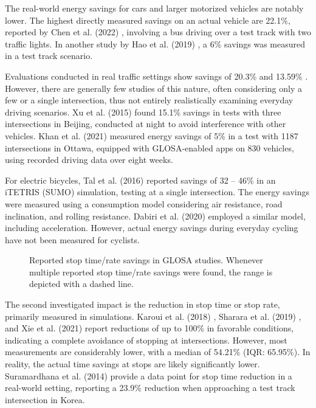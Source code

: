 The real-world energy savings for cars and larger motorized vehicles are notably lower. The highest directly measured savings on an actual vehicle are 22.1\%, reported by Chen et al. (2022) \cite{chen_developing_2022}, involving a bus driving over a test track with two traffic lights. In another study by Hao et al. (2019) \cite{hao_eco-approach_2019}, a 6\% savings was measured in a test track scenario.

Evaluations conducted in real traffic settings show savings of 20.3\% \cite{koukoumidis_signalguru_2011} and 13.59\% \cite{xia_field_2012}. However, there are generally few studies of this nature, often considering only a few or a single intersection, thus not entirely realistically examining everyday driving scenarios. Xu et al. (2015) \cite{xu_bb_2015} found 15.1\% savings in tests with three intersections in Beijing, conducted at night to avoid interference with other vehicles. Khan et al. (2021) \cite{khan_eco-drive_2021} measured energy savings of 5\% in a test with 1187 intersections in Ottawa, equipped with GLOSA-enabled apps on 830 vehicles, using recorded driving data over eight weeks.

For electric bicycles, Tal et al. (2016) \cite{tal_vehicular-communications-based_2016} reported savings of 32 -- 46\% in an iTETRIS (SUMO) simulation, testing at a single intersection. The energy savings were measured using a consumption model considering air resistance, road inclination, and rolling resistance. Dabiri et al. (2020) \cite{dabiri_optimized_2020} employed a similar model, including acceleration. However, actual energy savings during everyday cycling have not been measured for cyclists.

\begin{figure}
\centering
\resizebox{\linewidth}{!}{%

}
\caption{Reported stop time/rate savings in GLOSA studies. Whenever multiple reported stop time/rate savings were found, the range is depicted with a dashed line.}
\label{fig:related-work-stops}
\end{figure}

The second investigated impact is the reduction in stop time or stop rate, primarily measured in simulations. Karoui et al. (2018) \cite{karoui_efficiency_2018}, Sharara et al. (2019) \cite{sharara_impact_2019}, and Xie et al. (2021) \cite{xie_dynamic_2021} report reductions of up to 100\% in favorable conditions, indicating a complete avoidance of stopping at intersections. However, most measurements are considerably lower, with a median of 54.21\% (IQR: 65.95\%). In reality, the actual time savings at stops are likely significantly lower. Suramardhana et al. (2014) \cite{suramardhana_driver-centric_2014} provide a data point for stop time reduction in a real-world setting, reporting a 23.9\% reduction when approaching a test track intersection in Korea.

